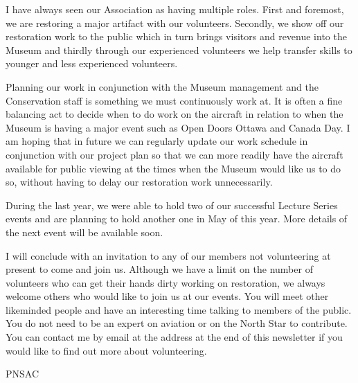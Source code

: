 I have always seen our Association as having multiple roles. First and foremost,
we are restoring a major artifact with our volunteers. Secondly, we show off our
restoration work to the public which in turn brings visitors and revenue into
the Museum and thirdly through our experienced volunteers we help transfer
skills to younger and less experienced volunteers.

Planning our work in conjunction with the Museum management and the Conservation
staff is something we must continuously work at. It is often a fine balancing
act to decide when to do work on the aircraft in relation to when the Museum is
having a major event such as Open Doors Ottawa and Canada Day. I am hoping that
in future we can regularly update our work schedule in conjunction with our
project plan so that we can more readily have the aircraft available for public
viewing at the times when the Museum would like us to do so, without having to
delay our restoration work unnecessarily.

During the last year, we were able to hold two of our successful Lecture Series
events and are planning to hold another one in May of this year. More details of
the next event will be available soon.

I will conclude with an invitation to any of our members not volunteering at
present to come and join us. Although we have a limit on the number of
volunteers who can get their hands dirty working on restoration, we always
welcome others who would like to join us at our events. You will meet other
likeminded people and have an interesting time talking to members of the public.
You do not need to be an expert on aviation or on the North Star to contribute.
You can contact me by email at the address at the end of this newsletter if you
would like to find out more about volunteering.

\begin{footnotesize}
    \raggedleft PNSAC\\
\end{footnotesize}



